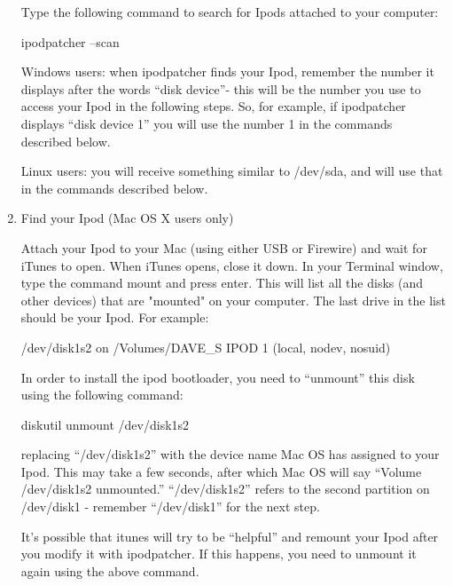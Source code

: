 \begin{enumerate}
    Type the following command to search for Ipods attached to
    your computer:
      \begin{code}
        ipodpatcher --scan
      \end{code}

    Windows users: when ipodpatcher finds your Ipod, remember the number it displays after the
    words ``disk device''- this will  be the number you use to access your Ipod
    in the following steps.  So, for example, if ipodpatcher displays ``disk
    device 1'' you will use the number 1 in the commands described below.

    Linux users: you will receive something similar to /dev/sda, and will use that
    in the commands described below.


  \item Find your Ipod (Mac OS X users only)

    Attach your Ipod to your Mac (using either USB or Firewire) and wait for 
    iTunes to open. When iTunes opens, close it down.  In your Terminal window, 
    type the command mount and press enter. This will list all the disks (and 
    other devices) that are "mounted" on your computer. The last  drive in the 
    list should be your Ipod. For example: 
    \begin{code}
       /dev/disk1s2 on /Volumes/DAVE_S IPOD 1 (local, nodev, nosuid) 
    \end{code}

    In order to install the ipod bootloader, you need to ``unmount'' this disk 
    using the following command: 
      \begin{code} 
        diskutil unmount /dev/disk1s2 
      \end{code}
      
    replacing ``/dev/disk1s2'' with the device name Mac OS has assigned to your
    Ipod. This may take a few seconds, after which Mac OS will say ``Volume 
    /dev/disk1s2 unmounted.'' ``/dev/disk1s2'' refers to the second partition on 
    /dev/disk1 - remember   ``/dev/disk1'' for the next step.

    It's possible that itunes will try to be ``helpful'' and remount your Ipod 
    after you modify it with ipodpatcher. If this happens, you need to unmount 
    it again using the above command. 
  

\end{enumerate}
